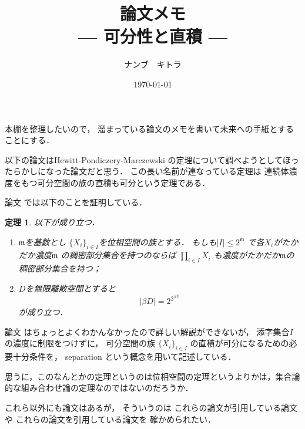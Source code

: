 \documentclass[leqno, a4paper, 12pt]{jsarticle}
\title{論文メモ
\large{\\--- 可分性と直積 ---}
}
\author{ナンブ　キトラ}
\date{\today}
\newtheorem{thm}{定理}
\begin{document}
\maketitle

本棚を整理したいので，
溜まっている論文のメモを書いて未来への手紙とすることにする．


以下の論文はHewitt-Pondiczery-Marczewski
の定理について調べようとしてほったらかしになった論文だと思う．
この長い名前が連なっている定理は
連続体濃度をもつ可分空間の族の直積も可分という定理である．

論文
\cite{MR0315649}
では以下のことを証明している．
\begin{thm}
以下が成り立つ．
\begin{enumerate}[label=\textup{(\arabic*)}]
\item 
$\mathfrak{m}$を基数とし
$\{X_{i}\}_{i\in I}$を位相空間の族とする．
もしも$|I|\le 2^{\mathfrak{m}}$
で各$X_{i}$がたかだか濃度$\mathfrak{m}$
の稠密部分集合を持つのならば
$\prod_{i\in I}X_{i}$
も濃度がたかだか$\mathfrak{m}$の稠密部分集合を持つ；
\item 
$D$を無限離散空間とすると
\[
|\beta D|=2^{2^{|D|}}
\]
が成り立つ．
\end{enumerate}
\end{thm}

論文
\cite{MR0221471}
はちょっとよくわかんなかったので詳しい解説ができないが，
添字集合$I$の濃度に制限をつけずに，
可分空間の族
$\{X_{i}\}_{i\in I}$
の直積が可分になるための必要十分条件を，
separation という概念を用いて記述している．

思うに，このなんとかの定理というのは位相空間の定理というよりかは，集合論的な組み合わせ論の定理なのではないのだろうか．

これら以外にも論文はあるが，
そういうのは
これらの論文が引用している論文や
これらの論文を引用している論文を
確かめられたい．

\nocite{*}


\end{document}

